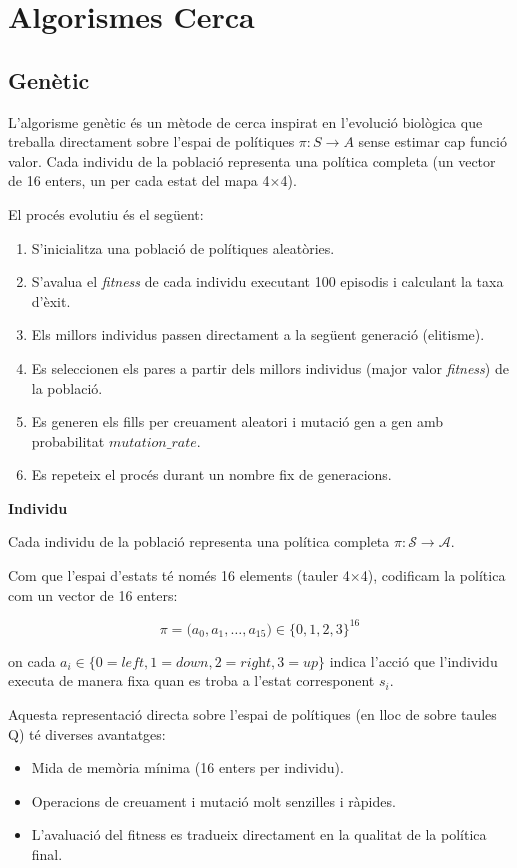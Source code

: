 \documentclass[12pt,a4paper]{report}
\begin{document}
\section{Algorismes Cerca}

\subsection{Genètic}

L'algorisme genètic és un mètode de cerca inspirat en l'evolució biològica que treballa directament sobre
l'espai de polítiques $\pi: S \to A$ sense estimar cap funció valor.
Cada individu de la població representa una política completa (un vector de 16 enters, un per cada estat del
mapa 4$\times$4).

El procés evolutiu és el següent:
\begin{enumerate}
  \item S'inicialitza una població de polítiques aleatòries.
  \item S'avalua el \textit{fitness} de cada individu executant 100 episodis i calculant la taxa d'èxit.
  \item Els millors individus passen directament a la següent generació (elitisme).
  \item Es seleccionen els pares a partir dels millors individus (major valor \textit{fitness}) de la població.
  \item Es generen els fills per creuament aleatori i mutació gen a gen amb probabilitat $\mathit{mutation\_rate}$.
  \item Es repeteix el procés durant un nombre fix de generacions.
\end{enumerate}

\textbf{Individu}

Cada individu de la població representa una política completa $\pi: \mathcal{S} \to \mathcal{A}$.

Com que l'espai d'estats té només 16 elements (tauler 4$\times$4), codificam la política com un vector de 16
enters:

\[
\pi = \bigl( a_0, a_1, \dots, a_{15} \bigr) \in \{0,1,2,3\}^{16}
\]

on cada $a_i \in \{0=\textit{left}, 1=\textit{down}, 2=\textit{right}, 3=\textit{up}\}$ indica l'acció que
l'individu executa de manera fixa quan es troba a l'estat corresponent $s_i$.  

Aquesta representació directa sobre l'espai de polítiques (en lloc de sobre taules Q) té diverses avantatges:
\begin{itemize}
  \item Mida de memòria mínima (16 enters per individu).
  \item Operacions de creuament i mutació molt senzilles i ràpides.
  \item L'avaluació del fitness es tradueix directament en la qualitat de la política final.
\end{itemize}
\end{document}
